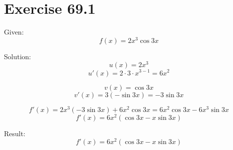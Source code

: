 \documentclass[a4paper, 10pt]{scrartcl}
\begin{document}
\section{Exercise 69.1}

Given:
\[f(x) = 2x^{3}\cos{3x}\]

Solution:
\[u(x) = 2x^{3}\]
\[u'(x) = 2\cdot3\cdot x^{3 - 1} = 6x^{2}\]

\[v(x) = \cos{3x}\]
\[v'(x) = 3(-\sin{3x}) = -3\sin{3x}\]

\[f'(x) = 2x^{3}(-3\sin{3x}) + 6x^{2}\cos{3x} = 6x^{2}\cos{3x} - 6x^{3}\sin{3x}\]
\[f'(x) = 6x^{2}(\cos{3x} - x\sin{3x})\]

Result:
\[f'(x) = 6x^{2}(\cos{3x} - x\sin{3x})\]
\end{document}
